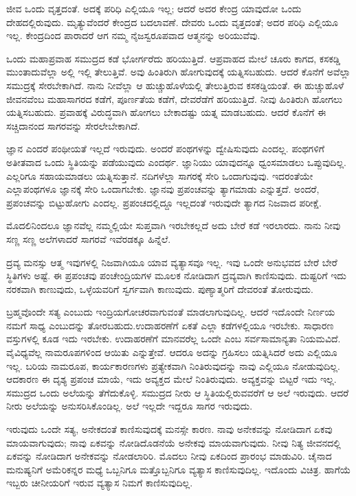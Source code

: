ಜೀವ ಒಂದು ವೃತ್ತದಂತೆ. ಅದಕ್ಕೆ ಪರಿಧಿ ಎಲ್ಲಿಯೂ ಇಲ್ಲ; ಆದರೆ ಅದರ ಕೇಂದ್ರ ಯಾವುದೋ ಒಂದು ದೇಹದಲ್ಲಿರುವುದು. ಮೃತ್ಯುವೆಂದರೆ ಕೇಂದ್ರದ ಬದಲಾವಣೆ. ದೇವರು ಒಂದು ವೃತ್ತದಂತೆ; ಅದರ ಪರಿಧಿ ಎಲ್ಲಿಯೂ ಇಲ್ಲ. ಕೇಂದ್ರದಿಂದ ಪಾರಾದರೆ ಆಗ ನಮ್ಮ ನೈಜಸ್ವರೂಪವಾದ ಆತ್ಮನನ್ನು ಅರಿಯುವೆವು.

ಒಂದು ಮಹಾಪ್ರವಾಹ ಸಮುದ್ರದ ಕಡೆ ಭೋರ್ಗರೆದು ಹರಿಯುತ್ತಿದೆ. ಆ\break ಪ್ರವಾಹದ ಮೇಲೆ ಚೂರು ಕಾಗದ, ಕಸಕಡ್ಡಿ ಮುಂತಾದುವೆಲ್ಲಾ ಅಲ್ಲಿ ಇಲ್ಲಿ ತೇಲುತ್ತಿವೆ. ಅವು ಹಿಂತಿರುಗಿ ಹೋಗುವುದಕ್ಕೆ ಯತ್ನಿಸಬಹುದು. ಆದರೆ ಕೊನೆಗೆ ಅವೆಲ್ಲಾ ಸಮುದ್ರಕ್ಕೆ ಸೇರಬೇಕಾಗಿದೆ. ನಾನು ನೀವೆಲ್ಲಾ ಆ ಹುಚ್ಚುಹೊಳೆಯಲ್ಲಿ ತೇಲುತ್ತಿರುವ ಕಸಕಡ್ಡಿಯಂತೆ. ಈ ಹುಚ್ಚುಹೊಳೆ ಜೀವನವೆಂಬ ಮಹಾಸಾಗರದ ಕಡೆಗೆ, ಪೂರ್ಣತೆಯ ಕಡೆಗೆ, ದೇವರೆಡೆಗೆ ಹರಿಯುತ್ತಿದೆ. ನೀವು ಹಿಂತಿರುಗಿ ಹೋಗಲು ಯತ್ನಿಸಬಹುದು. ಪ್ರವಾಹಕ್ಕೆ ವಿರುದ್ಧವಾಗಿ ಹೋಗಲು ಬೇಕಾದಷ್ಟು ಯತ್ನ ಮಾಡಬಹುದು. ಆದರೆ ಕೊನೆಗೆ ಈ ಸಚ್ಚಿದಾನಂದ ಸಾಗರವನ್ನು ಸೇರಲೇಬೇಕಾಗಿದೆ.

ಜ್ಞಾನ ಎಂದರೆ ಪಂಥೀಯತೆ ಇಲ್ಲದೆ ಇರುವುದು. ಅಂದರೆ ಪಂಥಗಳನ್ನು ದ್ವೇಷಿಸುವುದು ಎಂದಲ್ಲ. ಪಂಥಗಳಿಗೆ ಅತೀತವಾದ ಒಂದು ಸ್ಥಿತಿಯನ್ನು ಪಡೆಯುವುದು ಎಂದರ್ಥ. ಜ್ಞಾನಿಯು ಯಾವುದನ್ನೂ ಧ್ವಂಸಮಾಡಲು ಒಪ್ಪುವುದಿಲ್ಲ. ಎಲ್ಲರಿಗೂ ಸಹಾಯಮಾಡಲು ಯತ್ನಿಸುತ್ತಾನೆ. ನದಿಗಳೆಲ್ಲಾ ಸಾಗರಕ್ಕೆ ಸೇರಿ ಒಂದಾಗುವುವು. ಇದರಂತೆಯೇ ಎಲ್ಲಾ\break ಪಂಥಗಳೂ ಜ್ಞಾನಕ್ಕೆ ಸೇರಿ ಒಂದಾಗಬೇಕು. ಜ್ಞಾನವು ಪ್ರಪಂಚವನ್ನು ತ್ಯಾಗಮಾಡು ಎನ್ನುತ್ತದೆ. ಅಂದರೆ, ಪ್ರಪಂಚವನ್ನು ಬಿಟ್ಟುಹೋಗು ಎಂದಲ್ಲ. ಪ್ರಪಂಚದಲ್ಲಿದ್ದೂ ಇಲ್ಲದಂತೆ ಇರುವುದೇ ತ್ಯಾಗದ ನಿಜವಾದ ಪರೀಕ್ಷೆ.

ಮೊದಲಿನಿಂದಲೂ ಜ್ಞಾನವೆಲ್ಲ ನಮ್ಮಲ್ಲಿಯೇ ಸುಪ್ತವಾಗಿ ಇರಬೇಕಲ್ಲದೆ ಅದು ಬೇರೆ ಕಡೆ ಇರಲಾರದು. ನಾನು ನೀವು ಸಣ್ಣ ಸಣ್ಣ ಅಲೆಗಳಾದರೆ ಸಾಗರವೆ ಇವೆರಡಕ್ಕೂ ಹಿನ್ನೆಲೆ.

ದ್ರವ್ಯ ಮನಸ್ಸು ಆತ್ಮ ಇವುಗಳಲ್ಲಿ ನಿಜವಾಗಿಯೂ ಯಾವ ವ್ಯತ್ಯಾಸವೂ ಇಲ್ಲ. ಇವು ಒಂದೇ ಅನುಭವದ ಬೇರೆ ಬೇರೆ ಸ್ಥಿತಿಗಳು ಅಷ್ಟೆ. ಈ ಪ್ರಪಂಚವು ಪಂಚೇಂದ್ರಿಯಗಳ ಮೂಲಕ ನೋಡಿದಾಗ ದ್ರವ್ಯವಾಗಿ ಕಾಣಿಸುವುದು. ದುಷ್ಟರಿಗೆ ಇದು ನರಕವಾಗಿ ಕಾಣುವುದು, ಒಳ್ಳೆಯವರಿಗೆ ಸ್ವರ್ಗವಾಗಿ ಕಾಣುವುದು. ಪುಣ್ಯಾತ್ಮರಿಗೆ ದೇವರಂತೆ ತೋರುವುದು.

ಬ್ರಹ್ಮವೊಂದೇ ಸತ್ಯ ಎಂಬುದು ಇಂದ್ರಿಯಗೋಚರವಾಗುವಂತೆ ಮಾಡಲಾಗುವುದಿಲ್ಲ. ಆದರೆ ಇದೊಂದೇ ನಿರ್ಣಯ ನಮಗೆ ಸಾಧ್ಯ ಎಂಬುದನ್ನು ತೋರಬಹುದು.\break ಉದಾಹರಣೆಗೆ ಏಕತೆ ಎಲ್ಲಾ ಕಡೆಗಳಲ್ಲಿಯೂ ಇರಬೇಕು. ಸಾಧಾರಣ ವಸ್ತುಗಳಲ್ಲಿ ಕೂಡ ಇದು ಇರಬೇಕು. ಉದಾಹರಣೆಗೆ ಮಾನವರೆಲ್ಲ ಒಂದೇ ಎಂಬ ಸರ್ವಸಾಮಾನ್ಯತಾ ನಿಯಮವಿದೆ. ವೈವಿಧ್ಯವೆಲ್ಲ ನಾಮರೂಪಗಳಿಂದ ಆಯಿತು ಎನ್ನುತ್ತೇವೆ. ಆದರೂ ಅದನ್ನು ಗ್ರಹಿಸಲು ಯತ್ನಿಸಿದರೆ ಅದು ಎಲ್ಲಿಯೂ ಇಲ್ಲ. ಬರಿಯ ನಾಮರೂಪ, ಕಾರ್ಯಕಾರಣಗಳು ಪ್ರತ್ಯೇಕವಾಗಿ ನಿಂತಿರುವುದನ್ನು ನಾವು ಎಲ್ಲಿಯೂ ನೋಡುವುದಿಲ್ಲ. ಆದಕಾರಣ ಈ ದೃಶ್ಯ ಪ್ರಪಂಚ ಮಾಯೆ, ಇದು ಅವ್ಯಕ್ತದ ಮೇಲೆ ನಿಂತಿರುವುದು. ಅವ್ಯಕ್ತವನ್ನು ಬಿಟ್ಟರೆ ಇದು ಇಲ್ಲ. ಸಮುದ್ರದ ಒಂದು ಅಲೆಯನ್ನು ತೆಗೆದುಕೊಳ್ಳಿ. ಸಮುದ್ರದ ನೀರು ಆ ಸ್ಥಿತಿಯಲ್ಲಿರುವವರೆಗೆ ಆ ಅಲೆ ಇರುವುದು. ಆದರೆ ನೀರು ಅಲೆಯನ್ನು ಅನುಸರಿಸಿಕೊಂಡಿಲ್ಲ. ಅಲೆ ಇಲ್ಲದೇ ಇದ್ದರೂ ಸಾಗರ ಇರುವುದು.

ಇರುವುದು ಒಂದೇ ಸತ್ಯ, ಅನೇಕದಂತೆ ಕಾಣಿಸುವುದಕ್ಕೆ ಮನಸ್ಸೇ ಕಾರಣ. ನಾವು ಅನೇಕವನ್ನು ನೋಡಿದಾಗ ಏಕವು ಮಾಯವಾಗುವುದು; ನಾವು ಏಕವನ್ನು ನೋಡಿದೊಡನೆಯೆ ಅನೇಕವು ಮಾಯವಾಗುವುದು. ನೀವು ನಿತ್ಯ ಜೀವನದಲ್ಲಿ ಏಕವನ್ನು ನೋಡಿದಾಗ ಅನೇಕವನ್ನು ನೋಡಲಾರಿರಿ. ಮೊದಲು ನೀವು ಏಕದಿಂದ ಪ್ರಾರಂಭ ಮಾಡುವಿರಿ. ಚೈನಾದ ಮನುಷ್ಯನಿಗೆ ಅಮೆರಿಕನ್ನರ ಮಧ್ಯೆ ಒಬ್ಬನಿಗೂ ಮತ್ತೊಬ್ಬನಿಗೂ ವ್ಯತ್ಯಾಸ ಕಾಣಿಸುವುದಿಲ್ಲ. ಇದೊಂದು ವಿಚಿತ್ರ. ಹಾಗೆಯೆ ಇಬ್ಬರು ಚೀನೀಯರಿಗೆ ಇರುವ ವ್ಯತ್ಯಾಸ ನಿಮಗೆ ಕಾಣಿಸುವುದಿಲ್ಲ.

